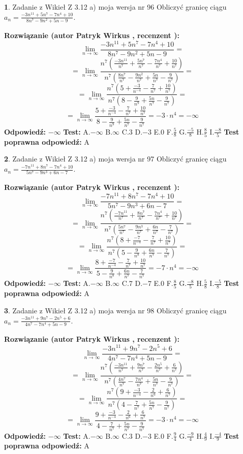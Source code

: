 \documentclass[12pt, a4paper]{article}
\theoremstyle{definition} %
\newtheorem{zad}{}
\newcommand{\zadStart}[1]{\begin{zad}#1\newline}
\newcommand{\zadStop}{\end{zad}}
\newcommand{\rozwStart}[2]{\noindent \textbf{Rozwiązanie (autor #1 , recenzent #2): }\newline}
\newcommand{\rozwStop}{\newline}
\newcommand{\odpStart}{\noindent \textbf{Odpowiedź:}\newline}
\newcommand{\odpStop}{\newline}
\newcommand{\testStart}{\noindent \textbf{Test:}\newline}
\newcommand{\testStop}{\newline}
\newcommand{\kluczStart}{\noindent \textbf{Test poprawna odpowiedź:}\newline}
\newcommand{\kluczStop}{\newline}
\begin{document}
\zadStart{Zadanie z Wikieł Z 3.12 a) moja wersja nr 96}
Obliczyć granicę ciągu $a_{n}=\frac{-3n^{11}+5n^{7}-7n^{4}+10}{8n^{7}-9n^{2}+5n-9}$.
\zadStop
\rozwStart{Patryk Wirkus}{}
$$\lim\limits_{n\to\infty}\frac{-3n^{11}+5n^{7}-7n^{4}+10}{8n^{7}-9n^{2}+5n-9}=$$
$$=\lim\limits_{n\to\infty}\frac{n^{7}\left(\frac{-3n^{11}}{n^{7}}+\frac{5n^{7}}{n^{7}}-\frac{7n^{4}}{n^{7}}+\frac{10}{n^{7}}\right)}{n^{7}\left(\frac{8n^{7}}{n^{7}}-\frac{9n^{2}}{n^{7}}+\frac{5n}{n^{7}}-\frac{9}{n^{7}}\right)}=$$
$$=\lim\limits_{n\to\infty}\frac{n^{7}\left(5+\frac{-3}{n^{-4}}-\frac{7}{n^{7}}+\frac{10}{n^{7}}\right)}
{n^{7}\left(8-\frac{9}{n^{9}}+\frac{5n}{n^{7}}-\frac{9}{n^{7}}\right)}=$$
$$=\lim\limits_{n\to\infty}\frac{5+\frac{-3}{n^{-4}}-\frac{7}{n^{7}}+\frac{10}{n^{7}}}{8-\frac{9}{n^{9}}+\frac{5n}{n^{7}}-\frac{9}{n^{7}}}=-3\cdot n^{4} = -\infty$$
\rozwStop
\odpStart
$-\infty$
\odpStop
\testStart
A.$-\infty$
B.$\infty$
C.$3$
D.$-3$
E.$0$
F.$\frac{5}{8}$
G.$\frac{-5}{8}$
H.$\frac{8}{5}$
I.$\frac{-8}{5}$
\testStop
\kluczStart
A
\kluczStop



\zadStart{Zadanie z Wikieł Z 3.12 a) moja wersja nr 97}
Obliczyć granicę ciągu $a_{n}=\frac{-7n^{11}+8n^{7}-7n^{4}+10}{5n^{7}-9n^{3}+6n-7}$.
\zadStop
\rozwStart{Patryk Wirkus}{}
$$\lim\limits_{n\to\infty}\frac{-7n^{11}+8n^{7}-7n^{4}+10}{5n^{7}-9n^{3}+6n-7}=$$
$$=\lim\limits_{n\to\infty}\frac{n^{7}\left(\frac{-7n^{11}}{n^{7}}+\frac{8n^{7}}{n^{7}}-\frac{7n^{4}}{n^{7}}+\frac{10}{n^{7}}\right)}{n^{7}\left(\frac{5n^{7}}{n^{7}}-\frac{9n^{3}}{n^{7}}+\frac{6n}{n^{7}}-\frac{7}{n^{7}}\right)}=$$
$$=\lim\limits_{n\to\infty}\frac{n^{7}\left(8+\frac{-7}{n^{-4}}-\frac{7}{n^{7}}+\frac{10}{n^{7}}\right)}
{n^{7}\left(5-\frac{9}{n^{8}}+\frac{6n}{n^{7}}-\frac{7}{n^{7}}\right)}=$$
$$=\lim\limits_{n\to\infty}\frac{8+\frac{-7}{n^{-4}}-\frac{7}{n^{7}}+\frac{10}{n^{7}}}{5-\frac{9}{n^{8}}+\frac{6n}{n^{7}}-\frac{7}{n^{7}}}=-7\cdot n^{4} = -\infty$$
\rozwStop
\odpStart
$-\infty$
\odpStop
\testStart
A.$-\infty$
B.$\infty$
C.$7$
D.$-7$
E.$0$
F.$\frac{8}{5}$
G.$\frac{-8}{5}$
H.$\frac{5}{8}$
I.$\frac{-5}{8}$
\testStop
\kluczStart
A
\kluczStop



\zadStart{Zadanie z Wikieł Z 3.12 a) moja wersja nr 98}
Obliczyć granicę ciągu $a_{n}=\frac{-3n^{11}+9n^{7}-2n^{5}+6}{4n^{7}-7n^{4}+5n-9}$.
\zadStop
\rozwStart{Patryk Wirkus}{}
$$\lim\limits_{n\to\infty}\frac{-3n^{11}+9n^{7}-2n^{5}+6}{4n^{7}-7n^{4}+5n-9}=$$
$$=\lim\limits_{n\to\infty}\frac{n^{7}\left(\frac{-3n^{11}}{n^{7}}+\frac{9n^{7}}{n^{7}}-\frac{2n^{5}}{n^{7}}+\frac{6}{n^{7}}\right)}{n^{7}\left(\frac{4n^{7}}{n^{7}}-\frac{7n^{4}}{n^{7}}+\frac{5n}{n^{7}}-\frac{9}{n^{7}}\right)}=$$
$$=\lim\limits_{n\to\infty}\frac{n^{7}\left(9+\frac{-3}{n^{-4}}-\frac{2}{n^{6}}+\frac{6}{n^{7}}\right)}
{n^{7}\left(4-\frac{7}{n^{7}}+\frac{5n}{n^{7}}-\frac{9}{n^{7}}\right)}=$$
$$=\lim\limits_{n\to\infty}\frac{9+\frac{-3}{n^{-4}}-\frac{2}{n^{6}}+\frac{6}{n^{7}}}{4-\frac{7}{n^{7}}+\frac{5n}{n^{7}}-\frac{9}{n^{7}}}=-3\cdot n^{4} = -\infty$$
\rozwStop
\odpStart
$-\infty$
\odpStop
\testStart
A.$-\infty$
B.$\infty$
C.$3$
D.$-3$
E.$0$
F.$\frac{9}{4}$
G.$\frac{-9}{4}$
H.$\frac{4}{9}$
I.$\frac{-4}{9}$
\testStop
\kluczStart
A
\kluczStop
\end{document}
